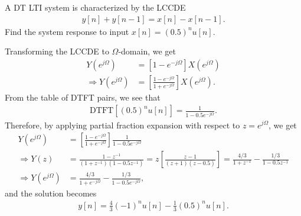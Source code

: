 \documentclass{report}
\begin{document}
\begin{example}
    A DT LTI system is characterized by the LCCDE 
    \begin{align*}
        y[n]+y[n-1] = x[n]-x[n-1].
    \end{align*}
    Find the system response to input $x[n]=(0.5)^n u[n]$.
\end{example}
\begin{solution}
    Transforming the LCCDE to $\Omega$-domain, we get 
    \begin{align*}
        [1+e^{-j\Omega}]Y(e^{j\Omega}) &= [1-e^{-j\Omega}]X(e^{j\Omega}) \\
        \Longrightarrow Y(e^{j\Omega}) &= \left[\frac{1-e^{-j\Omega}}{1+e^{-j\Omega}}\right]X(e^{j\Omega}).
    \end{align*}
    From the table of DTFT pairs, we see that
    \begin{align*}
        \text{DTFT}\left[(0.5)^n u[n]\right] = \frac{1}{1-0.5e^{-j\Omega}}.
    \end{align*}
    Therefore, by applying partial fraction expansion with respect to $z=e^{j\Omega}$, we get
    \begin{align*}
        Y(e^{j\Omega}) &= \left[\frac{1-e^{-j\Omega}}{1+e^{-j\Omega}}\right]\frac{1}{1-0.5e^{-j\Omega}} \\
        \Longrightarrow Y(z) &= \frac{1-z^{-1}}{(1+z^{-1})(1-0.5z^{-1})} = z\left[\frac{z-1}{(z+1)(z-0.5)}\right] = \frac{4/3}{1+z^{-1}} - \frac{1/3}{1-0.5z^{-1}} \\
        \Longrightarrow Y(e^{j\Omega}) &= \frac{4/3}{1+e^{-j\Omega}}-\frac{1/3}{1-0.5e^{-j\Omega}},
    \end{align*}
    and the solution becomes 
    \begin{align*}
        y[n] = \frac{4}{3}(-1)^n u[n] - \frac{1}{3}(0.5)^n u[n].
    \end{align*}
\end{solution}
\end{document}
